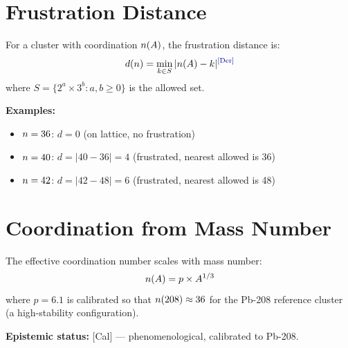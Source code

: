 \section{Frustration Distance}
\label{sec:M6:frustration}

\begin{derivationbox}[title=Frustration Distance Definition]
    For a cluster with coordination $n(A)$, the frustration distance is:
    \begin{equation}
        d(\ncoord) = \min_{k \in S} |\ncoord(A) - k| \tagDer
        \label{eq:frustration_distance}
    \end{equation}
    where $S = \{2^a \times 3^b : a, b \geq 0\}$ is the allowed set.
\end{derivationbox}

\textbf{Examples:}
\begin{itemize}
    \item $n = 36$: $d = 0$ (on lattice, no frustration)
    \item $n = 40$: $d = |40 - 36| = 4$ (frustrated, nearest allowed is 36)
    \item $n = 42$: $d = |42 - 48| = 6$ (frustrated, nearest allowed is 48)
\end{itemize}

\section{Coordination from Mass Number}
\label{sec:M6:nA}

\begin{derivationbox}[title=Coordination Function]
    The effective coordination number scales with mass number: \tagCal
    \begin{equation}
        n(A) = p \times A^{1/3}
        \label{eq:n_of_A}
    \end{equation}
    where $p = 6.1$ is calibrated so that $n(208) \approx 36$ for the
    Pb-208 reference cluster (a high-stability configuration).

    \textbf{Epistemic status:} [Cal] — phenomenological, calibrated to Pb-208.
\end{derivationbox}

